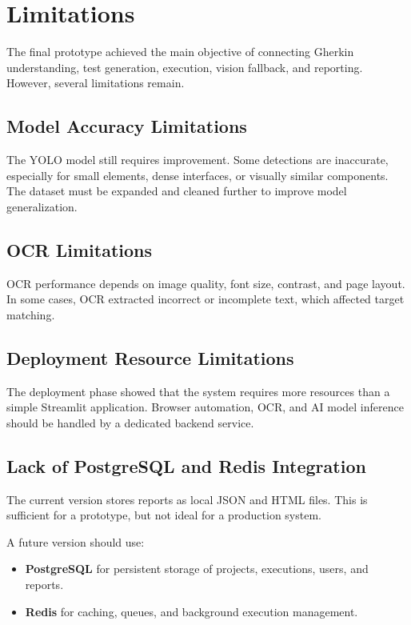 \section{Limitations}
\label{sec:chapter5_limitations}

The final prototype achieved the main objective of connecting Gherkin understanding, test generation, execution, vision fallback, and reporting. However, several limitations remain.

\subsection{Model Accuracy Limitations}
\label{subsec:model_accuracy_limitations}

The YOLO model still requires improvement. Some detections are inaccurate, especially for small elements, dense interfaces, or visually similar components. The dataset must be expanded and cleaned further to improve model generalization.

\subsection{OCR Limitations}
\label{subsec:ocr_limitations}

OCR performance depends on image quality, font size, contrast, and page layout. In some cases, OCR extracted incorrect or incomplete text, which affected target matching.

\subsection{Deployment Resource Limitations}
\label{subsec:deployment_resource_limitations}

The deployment phase showed that the system requires more resources than a simple Streamlit application. Browser automation, OCR, and AI model inference should be handled by a dedicated backend service.

\subsection{Lack of PostgreSQL and Redis Integration}
\label{subsec:postgres_redis_limitations}

The current version stores reports as local JSON and HTML files. This is sufficient for a prototype, but not ideal for a production system.

A future version should use:

\begin{itemize}
	\item \textbf{PostgreSQL} for persistent storage of projects, executions, users, and reports.
	\item \textbf{Redis} for caching, queues, and background execution management.
\end{itemize}

